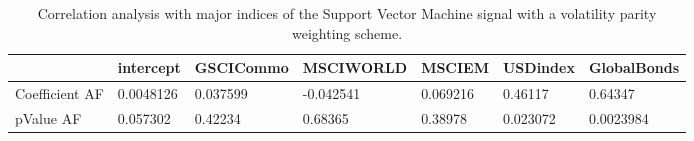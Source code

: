 \begin{table}[H]
\centering
\begin{tabular}{lllllll}
& intercept & GSCICommo & MSCIWORLD & MSCIEM & USDindex & GlobalBonds \\ 
\hline 
Coefficient AF & 0.0048126 & 0.037599 & -0.042541 & 0.069216 & 0.46117 & 0.64347 \\ 
pValue AF & 0.057302 & 0.42234 & 0.68365 & 0.38978 & 0.023072 & 0.0023984 \\ 
\hline
\end{tabular}
\caption{Correlation analysis with major indices of the Support Vector Machine signal with a volatility parity weighting scheme.}
\label{SVM_MODEL_AFACTOR}
\end{table}